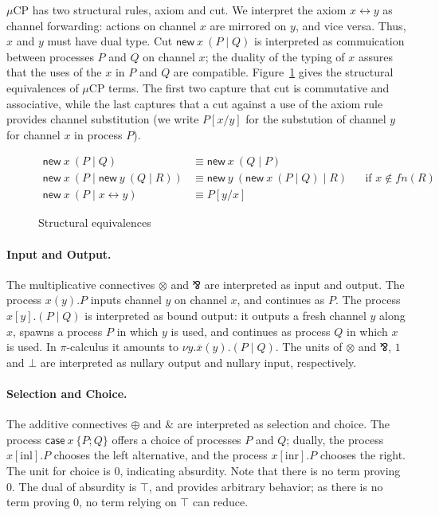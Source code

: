 \documentclass[orivec,envcountsame]{llncs}
\newcommand{\with}{\mathbin\binampersand}
\newcommand{\parr}{\mathbin\bindnasrepma}
\newcommand{\cpdual}[1]{#1^\perp}
\newcommand{\mkwd}[1]{\mathsf{#1}}
\newcommand{\link}[2]{#1 \leftrightarrow #2}
\newcommand{\cut}[4]{\mkwd{new}\:#1 \: (#3 \mid #4)}
\newcommand{\clabel}[1]{\mathrm{#1}}
\renewcommand{\case}[2]{\mkwd{case}\:#1\:\{#2\}}
\newcommand{\sel}[2]{#1[\clabel{#2}]}
\newcommand{\mucp}{$\mu\mathrm{CP}$\xspace}
\begin{document}
\mucp has two structural rules, axiom and cut.  We interpret the axiom $\link{x}{y}$ as channel
forwarding: actions on channel $x$ are mirrored on $y$, and vice versa.  Thus, $x$ and $y$ must have
dual type.  Cut $\cut{x}{A}{P}{Q}$ is interpreted as commuication between processes $P$ and $Q$ on
channel $x$; the duality of the typing of $x$ assures that the uses of the $x$ in $P$ and $Q$ are
compatible.  Figure~\ref{fig:equivalences} gives the structural equivalences of \mucp terms.  The
first two capture that cut is commutative and associative, while the last captures that a cut
against a use of the axiom rule provides channel substitution (we write $P[x/y]$ for the substution
of channel $y$ for channel $x$ in process $P$).

\begin{figure}
\begin{align*}
  \cut{x}{A}{P}{Q} &\equiv \cut{x}{\cpdual{A}}{Q}{P} \\
  \cut{x}{A}{P}{\cut{y}{B}{Q}{R}} &\equiv \cut{y}{B}{\cut{x}{A}{P}{Q}}{R} &&\text{if $x \not\in fn(R)$} \\
  \cut{x}{A}{P}{\link{x}{y}} &\equiv P[y/x]
\end{align*}
\caption{Structural equivalences}\label{fig:equivalences}
\end{figure}

\paragraph{Input and Output.}

The multiplicative connectives $\otimes$ and $\parr$ are interpreted as input and output. The
process $x(y).P$ inputs channel $y$ on channel $x$, and continues as $P$. The process $x[y].(P \mid
Q)$ is interpreted as bound output: it outputs a fresh channel $y$ along $x$, spawns a process $P$
in which $y$ is used, and continues as process $Q$ in which $x$ is used. In $\pi$-calculus it
amounts to $\nu y.\overline{x}(y).(P \mid Q)$. The units of $\otimes$ and $\parr$, $1$ and $\bot$
are interpreted as nullary output and nullary input, respectively.

\paragraph{Selection and Choice.}

The additive connectives $\oplus$ and $\with$ are interpreted as selection and choice. The process
$\case{x}{P;Q}$ offers a choice of processes $P$ and $Q$; dually, the process $\sel{x}{inl}.P$
chooses the left alternative, and the process $\sel{x}{inr}.P$ chooses the right.  The unit for
choice is $0$, indicating absurdity. Note that there is no term proving $0$.  The dual of absurdity
is $\top$, and provides arbitrary behavior; as there is no term proving $0$, no term relying on
$\top$ can reduce.
\end{document}
